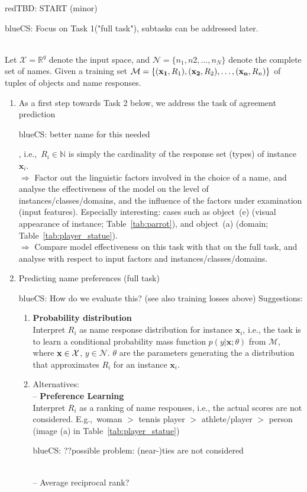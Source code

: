 \documentclass[11pt,a4paper]{article}
\newcommand{\cs}[1]{\begin{color}{blue}CS: #1\end{color}\xspace}
\newcommand{\tbd}[1]{\begin{color}{red}TBD: #1\end{color}\xspace}
\begin{document}
\tbd{START (minor)}
\cs{Focus on Task 1("full task"), subtasks can be addressed later.}\\
Let $\mathcal{X} = \mathbb{R}^q$ denote the input space, and $\mathcal{N} = \{n_1, n2, \dots, n_N\}$ denote the complete set of names. 
Given a training set $\mathcal{M} = \{({\bf x_1},R_1), ({\bf x_2},R_2),\dots,({\bf x_n},R_n)\}$ of tuples of objects and name responses. 
\begin{enumerate}
	\item As a first step towards Task 2 below, we address the task of agreement prediction \cs{better name for this needed}, i.e.,~$R_i \in \mathbb{N}$ is simply the cardinality of the response set (types) of instance~$\mathbf{x}_i$.\\
	$\Rightarrow$ Factor out the linguistic factors involved in the choice of a name, and analyse the effectiveness of the model on the level of instances/classes/domains, and the influence of the factors under examination (input features). Especially interesting: cases such as object~(e) (visual appearance of instance; Table~\ref{tab:parrot}), and object~(a) (domain; Table~\ref{tab:player_statue}). \\
	$\Rightarrow$ Compare model effectiveness on this task with that on the full task, and analyse with respect to input factors and instances/classes/domains.
	\item Predicting  name preferences (full task)	
	\cs{How do we evaluate this? (see also training losses above) Suggestions:}
	\begin{enumerate}
		\item \textbf{Probability distribution}\\
		Interpret $R_i$ as name response distribution for instance $\mathbf{x}_i$, i.e., the task is to learn a conditional probability mass function $p(y|\mathbf{x};\theta)$ from $\mathcal{M}$, where ${\bf x} \in \mathcal{X}$, $y \in \mathcal{N}$.  $\theta$ are the parameters generating the a distribution that approximates $R_i$ for an instance $\mathbf{x}_i$.
		\item Alternatives: \\
		-- \textbf{Preference Learning}\\
		Interpret $R_i$ as a ranking of name responses, i.e., the actual scores are not considered. 
		E.g.,~woman $>$ tennis player $>$ athlete/player $>$ person (image (a) in Table~\ref{tab:player_statue}) \cs{??possible problem: (near-)ties are not considered}\\
		-- Average reciprocal rank?\\

\end{enumerate}
\end{enumerate}
\end{document}
